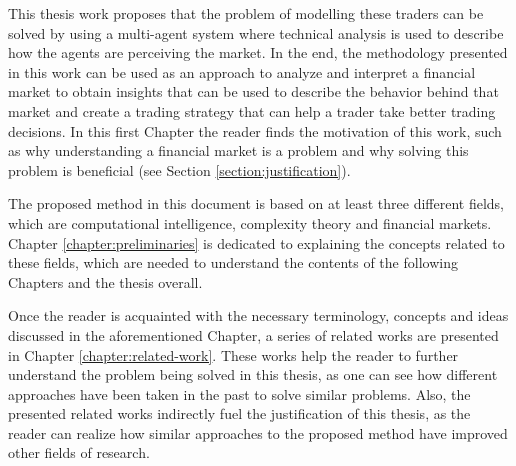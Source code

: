 

This thesis work proposes that the problem of modelling these traders can be
solved by using a multi-agent system where technical analysis is used to
describe how the agents are perceiving the market. In the end, the methodology
presented in this work can be used as an approach to analyze and interpret a
financial market to obtain insights that can be used to describe the behavior
behind that market and create a trading
strategy that can help a trader take better trading decisions. In this first
Chapter the reader finds the motivation of this work, such as why understanding
a financial market is a problem and why solving this problem is beneficial (see
Section \ref{section:justification}).



The proposed method in this document is based on at least three different
fields, which are computational intelligence, complexity theory and financial
markets. Chapter \ref{chapter:preliminaries} is dedicated to explaining the
concepts related to these fields, which are needed to understand the contents of
the following Chapters and the thesis overall.


Once the reader is acquainted with the necessary terminology, concepts and ideas
discussed in the aforementioned Chapter, a series of related works are presented
in Chapter \ref{chapter:related-work}. These works help the reader to further
understand the problem being solved in this thesis, as one can see how different
approaches have been taken in the past to solve similar problems. Also, the
presented related works indirectly fuel the justification of this thesis, as the
reader can realize how similar approaches to the proposed method have improved
other fields of research.

